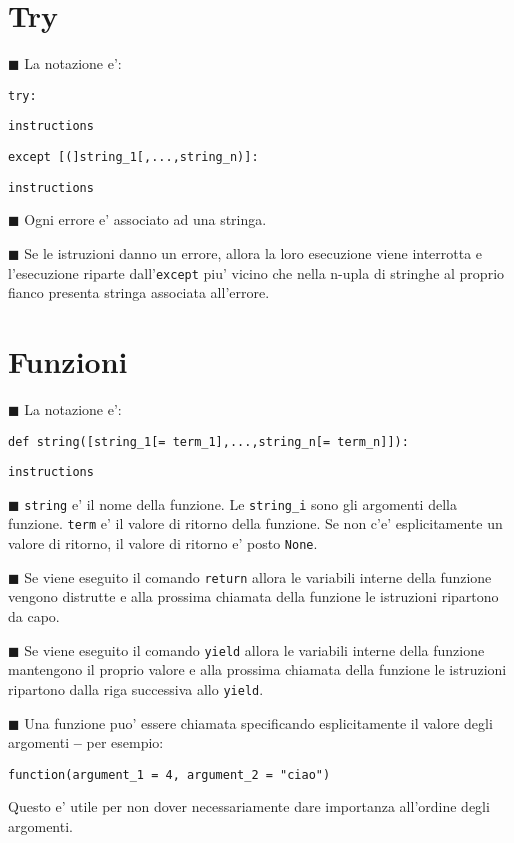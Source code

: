 \documentclass[a4paper,12pt,fleqn,leqno,twoside]{article}
\renewcommand{\b}{\textbf} %
\newcommand{\tw}{\texttt} %
\newcommand{\bbox}{{\scriptsize $\blacksquare$}} %
\newcommand{\skipline}{\vspace{\baselineskip}} %
\newcommand{\bitem}[1]{\bbox \; #1\par \skipline}
\begin{document}
\section{Try}

\bitem{La notazione e':}

\tw{try:}\par
\tw{\qquad instructions}\par
\tw{except [(]string\_1[,...,string\_n)]:}\par
\tw{\qquad instructions}\par

\skipline

\bitem{Ogni errore e' associato ad una stringa.}

\bitem{Se le istruzioni danno un errore, allora la loro esecuzione viene interrotta e l'esecuzione riparte dall'\tw{except} piu' vicino che nella n-upla di stringhe al proprio fianco presenta stringa associata all'errore.}

\section{Funzioni}

\bitem{La notazione e':}

\tw{def string([string\_1[= term\_1],...,string\_n[= term\_n]]):}\par
\tw{\qquad instructions}\par
\tw{}\par
\tw{}

\skipline

\bitem{\tw{string} e' il nome della funzione. Le \tw{string\_i} sono gli argomenti della funzione. \tw{term} e' il valore di ritorno della funzione. Se non c'e' esplicitamente un valore di ritorno, il valore di ritorno e' posto \tw{None}.}

\bitem{Se viene eseguito il comando \tw{return} allora le variabili interne della funzione vengono distrutte e alla prossima chiamata della funzione le istruzioni ripartono da capo.}

\bitem{Se viene eseguito il comando \tw{yield} allora le variabili interne della funzione mantengono il proprio valore e alla prossima chiamata della funzione le istruzioni ripartono dalla riga successiva allo \tw{yield}.}

\bitem{Una funzione puo' essere chiamata specificando esplicitamente il valore degli argomenti \b{--} per esempio:\par
\tw{function(argument\_1 = 4, argument\_2 = "ciao")}\par
Questo e' utile per non dover necessariamente dare importanza all'ordine degli argomenti.}
\end{document}
